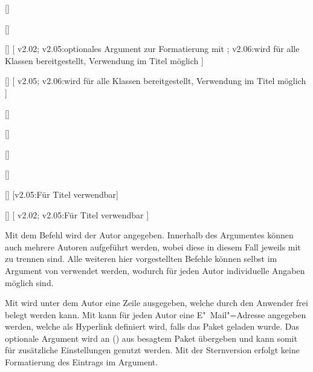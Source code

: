\begin{DeclareEntity*}{}
\begin{DeclareEntity*}{}
\begin{DeclareEntity*}{}
\begin{Declaration}
  {[]}
\begin{Declaration}
  {[]}
\begin{Declaration}
  {[]}
[%
  v2.02;%
  v2.05:optionales Argument zur Formatierung mit ;%
  v2.06:wird für alle Klassen bereitgestellt, Verwendung im Titel möglich%
]
\begin{Declaration}
  {[]}
[%
  v2.05;%
  v2.06:wird für alle Klassen bereitgestellt, Verwendung im Titel möglich%
]
\begin{Declaration}
  {[]}
\begin{Declaration}
  {[]}
\begin{Declaration}
  {[]}
\begin{Declaration}
  {[]}
\begin{Declaration}
  {[]}
  [v2.05:Für Titel verwendbar]
\begin{Declaration}
  {[]}
[%
  v2.02;%
  v2.05:Für Titel verwendbar%
]

Mit dem Befehl  wird der Autor angegeben. Innerhalb des 
Argumentes können auch mehrere Autoren aufgeführt werden, wobei diese in diesem 
Fall jeweils mit  zu trennen sind. Alle weiteren hier vorgestellten 
Befehle können selbst im Argument von  verwendet werden, wodurch 
für jeden Autor individuelle Angaben möglich sind.

Mit  wird unter dem Autor eine Zeile ausgegeben, welche 
durch den Anwender frei belegt werden kann. Mit  kann für 
jeden Autor eine E"~Mail"=Adresse angegeben werden, welche als Hyperlink
definiert wird, falls das Paket  geladen wurde. Das optionale 
Argument wird an () aus besagtem Paket 
übergeben und kann somit für zusätzliche Einstellungen genutzt werden. Mit der 
Sternversion  erfolgt keine Formatierung des Eintrags im 
Argument.


\end{Declaration}
\end{Declaration}
\end{Declaration}
\end{Declaration}
\end{Declaration}
\end{Declaration}
\end{Declaration}
\end{Declaration}
\end{Declaration}
\end{Declaration}
\end{DeclareEntity*}
\end{DeclareEntity*}
\end{DeclareEntity*}
